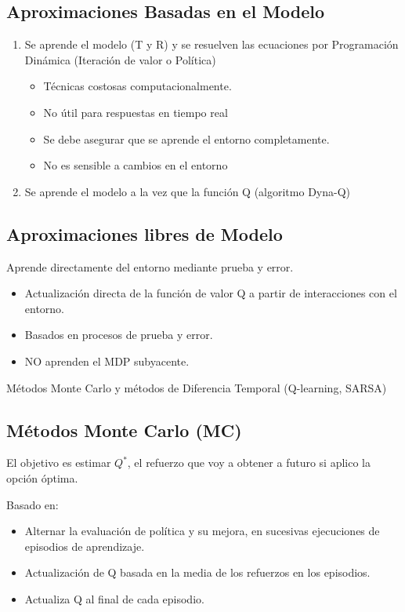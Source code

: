 \documentclass[12pt, twoside, openright]{report} %
\begin{document}
\subsection{Aproximaciones Basadas en el Modelo}
\begin{enumerate}
  \item Se aprende el modelo (T y R) y se resuelven las ecuaciones por Programación Dinámica (Iteración de valor o Política)
  \begin{itemize}
    \item Técnicas costosas computacionalmente.
    \item No útil para respuestas en tiempo real
    \item Se debe asegurar que se aprende el entorno completamente.
    \item No es sensible a cambios en el entorno 
  \end{itemize}
  \item Se aprende el modelo a la vez que la función Q (algoritmo Dyna-Q)
\end{enumerate}

\subsection{Aproximaciones libres de Modelo}
Aprende directamente del entorno mediante prueba y error.
\begin{itemize}
  \item Actualización directa de la función de valor Q a partir de interacciones con el entorno.
  \item Basados en procesos de prueba y error.
  \item NO aprenden el MDP subyacente.
\end{itemize}
Métodos Monte Carlo y métodos de Diferencia Temporal (Q-learning, SARSA)

\subsection{Métodos Monte Carlo (MC)}
El objetivo es estimar $Q^*$, el refuerzo que voy a obtener a futuro si aplico la opción óptima.

Basado en: 
\begin{itemize}
  \item Alternar la evaluación de política y su mejora, en sucesivas ejecuciones de episodios de aprendizaje.
  \item Actualización de Q basada en la media de los refuerzos en los episodios.
  \item Actualiza Q al final de cada episodio.
\end{itemize}
\end{document}
